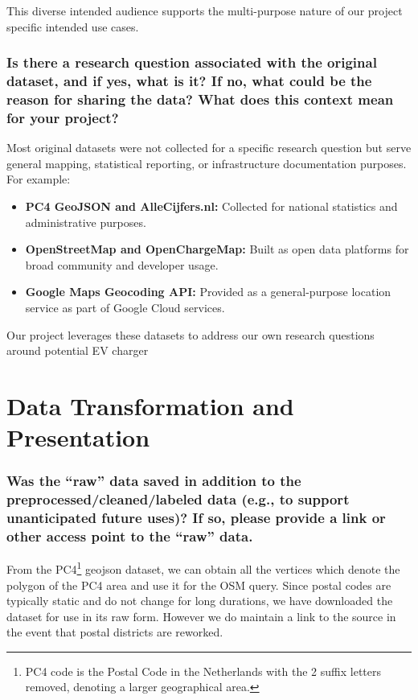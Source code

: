 \documentclass{article}
\newcommand{\question}[1]{#1}
\begin{document}
This diverse intended audience supports the multi-purpose nature of our project specific intended use cases.

\question{\subsubsection*{Is there a research question associated with the original dataset, and if yes, what is it? If no, what could be the reason for sharing the data? What does this context mean for your project?}}
\lipsum[1]
Most original datasets were not collected for a specific research question but serve general mapping, statistical reporting, or infrastructure documentation purposes. For example:

\begin{itemize}
	\item \textbf{PC4 GeoJSON and AlleCijfers.nl:} Collected for national statistics and administrative purposes.
	\item \textbf{OpenStreetMap and OpenChargeMap:} Built as open data platforms for broad community and developer usage.
	\item \textbf{Google Maps Geocoding API:} Provided as a general-purpose location service as part of Google Cloud services.
\end{itemize}

Our project leverages these datasets to address our own research questions around potential EV charger

\section{Data Transformation and Presentation}

\question{\subsubsection*{Was the “raw” data saved in addition to the preprocessed/cleaned/labeled data (e.g., to support unanticipated future uses)? If so, please provide a link or other access point to the “raw” data.}}

From the PC4\footnote{PC4 code is the Postal Code in the Netherlands with the 2 suffix letters removed, denoting a larger geographical area.} geojson dataset, we can obtain all the vertices which denote the polygon of the PC4 area and use it for the OSM query. Since postal codes are typically static and do not change for long durations, we have downloaded the dataset for use in its raw form. However we do maintain a link to the source in the event that postal districts are reworked.
\end{document}
